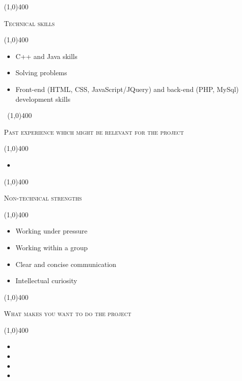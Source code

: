 \documentclass[12pt,a4paper]{report}
\begin{document}
	\begin{center}
	
	\line(1,0){400}\\
	{\scshape\large Technical skills\par}
	\line(1,0){400}\\
	\end{center}
	\begin{itemize}
        \item 
             C++ and Java skills
        \item 
            Solving problems
        \item  
            Front-end (HTML, CSS, JavaScript/JQuery) and back-end (PHP, MySql) development skills 
	\end{itemize}
\newpage
\begin{center}
	\vspace*{-3cm}\
	\line(1,0){400}\\
	{\scshape\large Past experience which might be relevant for the project\par}
	\line(1,0){400}\\
	\end{center}
		\begin{itemize}
\item 

\end{itemize}

	\begin{center}
	
	\line(1,0){400}\\
	{\scshape\large Non-technical strengths\par}
	\line(1,0){400}\\
	\end{center}
	\begin{itemize}
	\item 
		Working under pressure
	\item 
		Working within a group
	\item 
		Clear and concise communication
	\item 
		Intellectual curiosity
	\end{itemize}

\begin{center}
	
	\line(1,0){400}\\
	{\scshape\large What makes you want to do the project\par}
	\line(1,0){400}\\
	\end{center}
		\begin{itemize}
\item 
\item 
\item 
\item 
\end{itemize}
\end{document}
